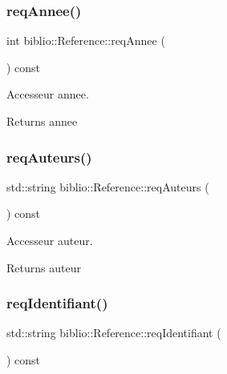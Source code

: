 \subsubsection{\texorpdfstring{req\+Annee()}{reqAnnee()}}
{\footnotesize\ttfamily int biblio\+::\+Reference\+::req\+Annee (\begin{DoxyParamCaption}{ }\end{DoxyParamCaption}) const\hspace{0.3cm}{\ttfamily [inline]}}



Accesseur annee. 

\begin{DoxyReturn}{Returns}
annee 
\end{DoxyReturn}
\mbox{\label{classbiblio_1_1Reference_a5521fc6d8894b38c314db3c300bd8a23}} 
\subsubsection{\texorpdfstring{req\+Auteurs()}{reqAuteurs()}}
{\footnotesize\ttfamily std\+::string biblio\+::\+Reference\+::req\+Auteurs (\begin{DoxyParamCaption}{ }\end{DoxyParamCaption}) const\hspace{0.3cm}{\ttfamily [inline]}}



Accesseur auteur. 

\begin{DoxyReturn}{Returns}
auteur 
\end{DoxyReturn}
\mbox{\label{classbiblio_1_1Reference_a1d47d3d615f219d41ce6dbd9c7b0651d}} 
\subsubsection{\texorpdfstring{req\+Identifiant()}{reqIdentifiant()}}
{\footnotesize\ttfamily std\+::string biblio\+::\+Reference\+::req\+Identifiant (\begin{DoxyParamCaption}{ }\end{DoxyParamCaption}) const\hspace{0.3cm}{\ttfamily [inline]}}



